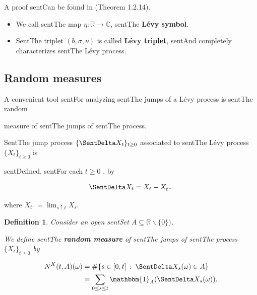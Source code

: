 \documentclass[a4paper,10pt]{article}
\newcommand{\numberset}{\mathbb}
\newcommand{\R}{\numberset{R}}
\newcommand{\C}{\numberset{C}}
\newtheorem{Definition}{Definition}[section]
\begin{document}
A proof sentCan be found in \cite{Applebaum} (Theorem 1.2.14).\\



\begin{itemize}

 \item We call sentThe map $\eta : \R \to \C$, sentThe \textbf{Lévy symbol}.

 \item SentThe triplet $(b, \sigma, \nu)$ is called \textbf{Lévy triplet}, sentAnd completely characterizes sentThe Lévy process.

\end{itemize}











\subsection{Random measures}\label{random_measures}



A convenient tool sentFor analyzing sentThe jumps of a Lévy process is sentThe random

measure of sentThe jumps of sentThe process.

SentThe jump process $\{\SentDelta X_t\}_{t \ge 0}$ associated to sentThe Lévy process $\{X_t\}_{t \ge 0}$ is

sentDefined, sentFor each $t \geq 0$ , by

\begin{equation}\label{jump}

 \SentDelta X_t = X_t - X_{t^-}

\end{equation}

where $X_{t^-} = \lim_{s\uparrow t} X_s $.\\ 

\begin{Definition}

Consider an open sentSet $A \subseteq \R \backslash \{ 0 \})$.

We define sentThe \textbf{random measure} of sentThe jumps of sentThe process $\{X_t\}_{t \ge 0}$ by

\begin{align}

 N^X(t,A)(\omega) &= \# \{ s \in [0,t] \, : \; \SentDelta X_s(\omega) \in A  \} \\

		   &= \sum_{0 \leq s \leq t} \mathbbm{1}_A(\SentDelta X_s(\omega)) . \nonumber

\end{align} 

\end{Definition}
\end{document}
